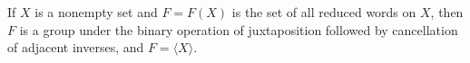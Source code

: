 \begin{theorem}
If $X$ is a nonempty set and $F = F(X)$ is the set of all reduced words on $X$, then $F$ is a group under the binary operation of juxtaposition followed by cancellation of adjacent inverses, and $F = \langle X \rangle$.
\end{theorem}
